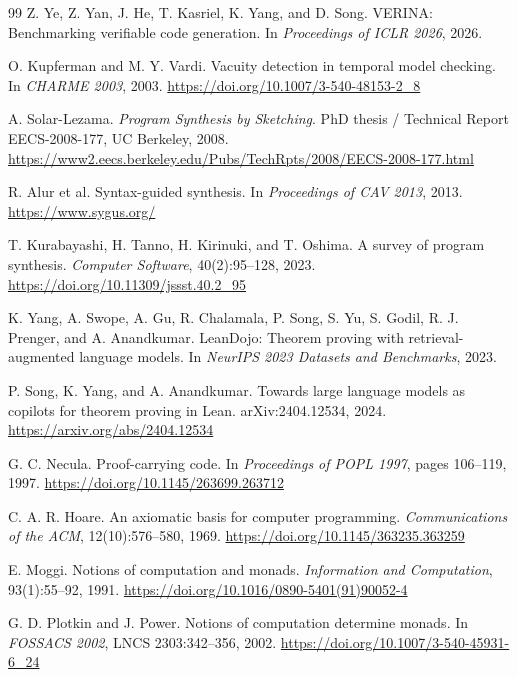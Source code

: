 \begin{thebibliography}{99}
Z. Ye, Z. Yan, J. He, T. Kasriel, K. Yang, and D. Song.
\newblock VERINA: Benchmarking verifiable code generation.
\newblock In \emph{Proceedings of ICLR 2026}, 2026.

O. Kupferman and M. Y. Vardi.
\newblock Vacuity detection in temporal model checking.
\newblock In \emph{CHARME 2003}, 2003.
\newblock \url{https://doi.org/10.1007/3-540-48153-2_8}

A. Solar-Lezama.
\newblock \emph{Program Synthesis by Sketching}.
\newblock PhD thesis / Technical Report EECS-2008-177, UC Berkeley, 2008.
\newblock \url{https://www2.eecs.berkeley.edu/Pubs/TechRpts/2008/EECS-2008-177.html}

R. Alur et al.
\newblock Syntax-guided synthesis.
\newblock In \emph{Proceedings of CAV 2013}, 2013.
\newblock \url{https://www.sygus.org/}

T. Kurabayashi, H. Tanno, H. Kirinuki, and T. Oshima.
\newblock A survey of program synthesis.
\newblock \emph{Computer Software}, 40(2):95--128, 2023.
\newblock \url{https://doi.org/10.11309/jssst.40.2_95}

K. Yang, A. Swope, A. Gu, R. Chalamala, P. Song, S. Yu, S. Godil, R. J. Prenger, and
A. Anandkumar.
\newblock LeanDojo: Theorem proving with retrieval-augmented language models.
\newblock In \emph{NeurIPS 2023 Datasets and Benchmarks}, 2023.

P. Song, K. Yang, and A. Anandkumar.
\newblock Towards large language models as copilots for theorem proving in Lean.
\newblock arXiv:2404.12534, 2024.
\newblock \url{https://arxiv.org/abs/2404.12534}

G. C. Necula.
\newblock Proof-carrying code.
\newblock In \emph{Proceedings of POPL 1997}, pages 106--119, 1997.
\newblock \url{https://doi.org/10.1145/263699.263712}

C. A. R. Hoare.
\newblock An axiomatic basis for computer programming.
\newblock \emph{Communications of the ACM}, 12(10):576--580, 1969.
\newblock \url{https://doi.org/10.1145/363235.363259}

E. Moggi.
\newblock Notions of computation and monads.
\newblock \emph{Information and Computation}, 93(1):55--92, 1991.
\newblock \url{https://doi.org/10.1016/0890-5401(91)90052-4}

G. D. Plotkin and J. Power.
\newblock Notions of computation determine monads.
\newblock In \emph{FOSSACS 2002}, LNCS 2303:342--356, 2002.
\newblock \url{https://doi.org/10.1007/3-540-45931-6_24}


\end{thebibliography}
